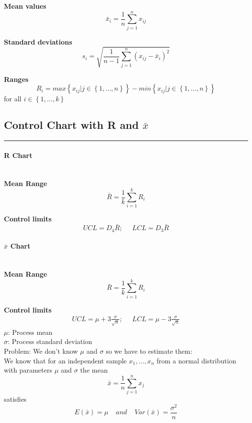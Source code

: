 \textbf{Mean values}
\begin{equation}
  \bar{x}_i = \frac{1}{n} \sum_{j=1}^n x_{ij}
\end{equation}

\textbf{Standard deviations}
\begin{equation}
  s_i = \sqrt{\frac{1}{n-1} \sum_{j=1}^n \left(x_{ij} - \bar{x}_i\right)^2}
\end{equation}

\textbf{Ranges}
\begin{equation}
  R_i = max\left \{x_{ij} | j \in \left \{1,...,n\right \} \right \} - min\left \{x_{ij} | j \in \left \{1,...,n\right \} \right \}
\end{equation}
for all $i \in \left \{1,...,k\right \}$

\subsection{Control Chart with R and $\bar{x}$}
\noindent\rule[\linienAbstand]{\linewidth}{\linienDicke}

\paragraph{R Chart}\mbox{}\\
\textbf{Mean Range}
\begin{equation}
  \bar{R} = \frac{1}{k} \sum^k_{i=1} R_i
\end{equation}

\textbf{Control limits}
\begin{equation}
    UCL = D_4 \bar{R}; \;\;\;\;\; LCL = D_3 \bar{R}
\end{equation}

\paragraph{$\bar{x}$ Chart}\mbox{}\\
\textbf{Mean Range}
\begin{equation}
  \bar{R} = \frac{1}{k} \sum^k_{i=1} R_i
\end{equation}

\textbf{Control limits}
\begin{equation}
  \begin{split}
    UCL = \mu + 3 \frac{\sigma}{\sqrt{n}}; \;\;\;\;\;  LCL = \mu - 3 \frac{\sigma}{\sqrt{n}}
  \end{split}
\end{equation}
$\mu$: Process mean\\
$\sigma$: Process standard deviation\\
Problem: We don't know $\mu$ and $\sigma$ so we have to estimate them:\\
We know that for an independent sample $x_1, ... ,x_n$ from a normal distribution with parameters $\mu$ and $\sigma$ the mean
\begin{equation}
  \bar{x} = \frac{1}{n} \sum_{j=1}^n x_{j}
\end{equation}
satisfies
\begin{equation}
  E\left(\bar{x}\right) = \mu \;\;\;\; and \;\;\;\; Var\left(\bar{x}\right) = \frac{\sigma^2}{n}
\end{equation}

